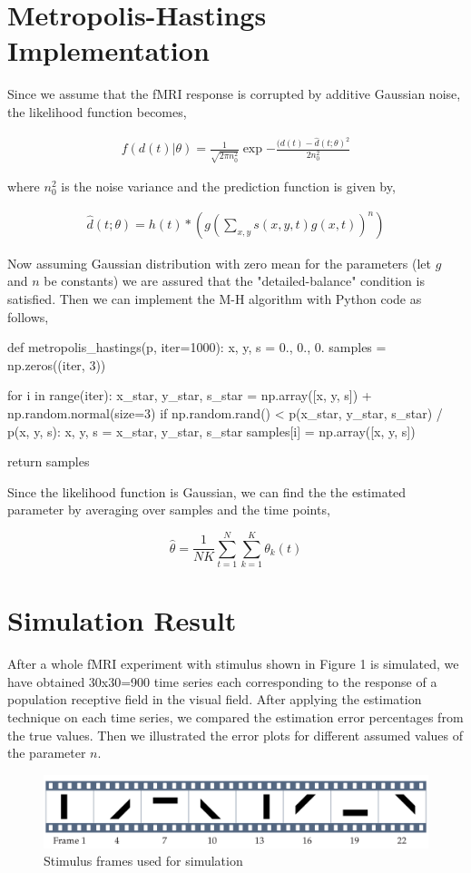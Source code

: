 \documentclass[review]{elsarticle}
\newcommand{\given}{|}
\newcommand{\pars}{\theta}
\begin{document}
\section{Metropolis-Hastings Implementation}
Since we assume that the fMRI response is corrupted by additive Gaussian noise, the likelihood function becomes,

\begin{eqnarray}
	f(d(t)\given\pars) = \frac{1}{\sqrt{2\pi n_0^2}}\exp{-\frac{(d(t) - \hat{d}(t;\pars)^2}{2 n_0^2}}
\end{eqnarray}

where $n_0^2$ is the noise variance and the prediction function is given by,

\begin{eqnarray}
\hat{d}(t;\pars) = h(t)* (g (\sum_{x, y} s(x, y, t) g(x, t))^n)
\end{eqnarray}

Now assuming Gaussian distribution with zero mean for the parameters (let $g$ and $n$ be constants) we are assured that the "detailed-balance" condition is satisfied. Then we can implement the M-H algorithm with Python code as follows,
\begin{python}
	def metropolis_hastings(p, iter=1000):
		x, y, s = 0., 0., 0.
		samples = np.zeros((iter, 3))
		
		for i in range(iter):
			x_star, y_star, s_star = np.array([x, y, s]) + np.random.normal(size=3)
			if np.random.rand() < p(x_star, y_star, s_star) / p(x, y, s):
				x, y, s = x_star, y_star, s_star
			samples[i] = np.array([x, y, s])
		
		return samples
\end{python}

Since the likelihood function is Gaussian, we can find the the estimated parameter by averaging over samples and the time points,

\begin{equation}
	\hat{\theta} = \frac{1}{NK}\sum_{t=1}^{N}\sum_{k=1}^{K} \pars_k(t)
\end{equation}
\section{Simulation Result}
After a whole fMRI experiment with stimulus shown in Figure 1 is simulated, we have obtained 30x30=900 time series each corresponding to the response of a population receptive field in the visual field. After applying the estimation technique on each time series, we compared the estimation error percentages from the true values. Then we illustrated the error plots for different assumed values of the parameter $n$.
\begin{figure}[htp]
	\centering
	\includegraphics[width=\textwidth]{stim.png}

	\caption{Stimulus frames used for simulation}
\end{figure}
\end{document}

